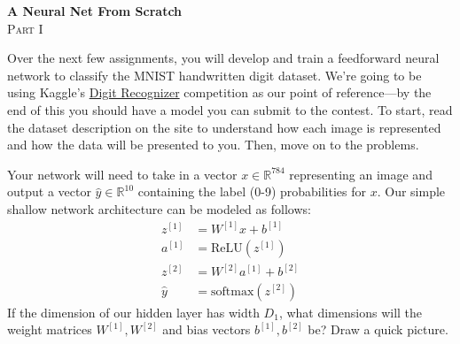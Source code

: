 \documentclass{article}
\newcommand{\R}{\mathbb{R}}
\newenvironment{envsection}[1]{\begin{trivlist}
\item[\hskip \labelsep {\bfseries #1}]}{\end{trivlist}}
\begin{document}
\setlength{\abovedisplayskip}{4pt}
\setlength{\belowdisplayskip}{4pt}


\begin{center}
    \Large{\textbf{A Neural Net From Scratch}}\\
    \vspace{1ex}
    \normalsize \textsc{Part I}
\end{center}
\vspace{10pt}



\noindent Over the next few assignments, you will develop and train a feedforward neural network to classify the MNIST handwritten digit dataset. We're going to be using Kaggle's \href{https://www.kaggle.com/competitions/digit-recognizer}{Digit Recognizer} competition as our point of reference---by the end of this you should have a model you can submit to the contest. To start, read the dataset description on the site to understand how each image is represented and how the data will be presented to you. Then, move on to the problems.


\begin{envsection}{Problem 1 (Network Architecture).}
    Your network will need to take in a vector $x \in \R^{784}$ representing an image and output a vector $\hat{y} \in \R^{10}$ containing the label (0-9) probabilities for $x$. Our simple shallow network architecture can be modeled as follows:
    \begin{align*}
        z^{[1]} &= W^{[1]}x + b^{[1]}\\
        a^{[1]} &= \text{ReLU}(z^{[1]})\\
        z^{[2]} &= W^{[2]}a^{[1]} + b^{[2]}\\
        \hat{y} &= \text{softmax}(z^{[2]})
    \end{align*}
    If the dimension of our hidden layer has width $D_1$, what dimensions will the weight matrices $W^{[1]}, W^{[2]}$ and bias vectors $b^{[1]}, b^{[2]}$ be? Draw a quick picture.
\end{envsection}
\end{document}
